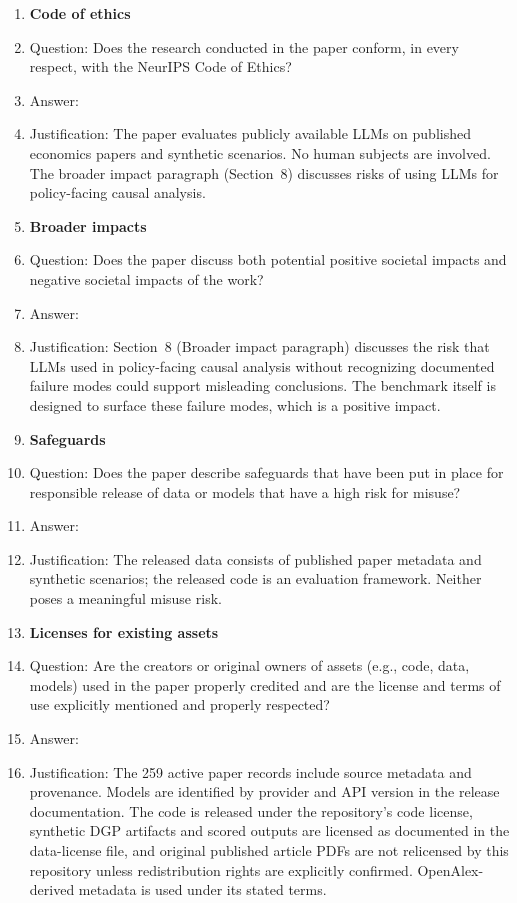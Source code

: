 \begin{enumerate}
\item {\bf Code of ethics}
    \item[] Question: Does the research conducted in the paper conform, in every respect, with the NeurIPS Code of Ethics?
    \item[] Answer: \answerYes{}
    \item[] Justification: The paper evaluates publicly available LLMs on published economics papers and synthetic scenarios. No human subjects are involved. The broader impact paragraph (Section~8) discusses risks of using LLMs for policy-facing causal analysis.

\item {\bf Broader impacts}
    \item[] Question: Does the paper discuss both potential positive societal impacts and negative societal impacts of the work?
    \item[] Answer: \answerYes{}
    \item[] Justification: Section~8 (Broader impact paragraph) discusses the risk that LLMs used in policy-facing causal analysis without recognizing documented failure modes could support misleading conclusions. The benchmark itself is designed to surface these failure modes, which is a positive impact.

\item {\bf Safeguards}
    \item[] Question: Does the paper describe safeguards that have been put in place for responsible release of data or models that have a high risk for misuse?
    \item[] Answer: \answerNA{}
    \item[] Justification: The released data consists of published paper metadata and synthetic scenarios; the released code is an evaluation framework. Neither poses a meaningful misuse risk.

\item {\bf Licenses for existing assets}
    \item[] Question: Are the creators or original owners of assets (e.g., code, data, models) used in the paper properly credited and are the license and terms of use explicitly mentioned and properly respected?
    \item[] Answer: \answerYes{}
    \item[] Justification: The 259 active paper records include source metadata and provenance. Models are identified by provider and API version in the release documentation. The code is released under the repository's code license, synthetic DGP artifacts and scored outputs are licensed as documented in the data-license file, and original published article PDFs are not relicensed by this repository unless redistribution rights are explicitly confirmed. OpenAlex-derived metadata is used under its stated terms.


\end{enumerate}
